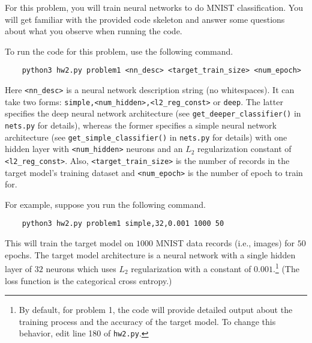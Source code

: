 For this problem, you will train neural networks to do MNIST classification. You will get familiar with the provided code skeleton and answer some questions about what you observe when running the code. 

To run the code for this problem, use the following command.
%
\begin{Verbatim}
	python3 hw2.py problem1 <nn_desc> <target_train_size> <num_epoch>
\end{Verbatim}
%

Here \texttt{<nn\_desc>} is a neural network description string (no whitespaces). It can take two forms: \texttt{simple,<num\_hidden>,<l2\_reg\_const>} or \texttt{deep}. The latter specifies the deep neural network architecture (see \texttt{get\_deeper\_classifier()} in \texttt{nets.py} for details), whereas the former specifies a simple neural network architecture (see \texttt{get\_simple\_classifier()} in \texttt{nets.py} for details) with one hidden layer with \texttt{<num\_hidden>} neurons and an $L_2$ regularization constant of \texttt{<l2\_reg\_const>}. Also, \texttt{<target\_train\_size>} is the number of records in the target model's training dataset and \texttt{<num\_epoch>} is the number of epoch to train for.


For example, suppose you run the following command.
%
\begin{Verbatim}
	python3 hw2.py problem1 simple,32,0.001 1000 50
\end{Verbatim}
This will train the target model on $1000$ MNIST data records (i.e., images) for $50$ epochs. The target model architecture is a neural network with a single hidden layer of $32$ neurons which uses $L_2$ regularization with a constant of $0.001$.\footnote{By default, for problem 1, the code will provide detailed output about the training process and the accuracy of the target model. To change this behavior, edit line 180 of \texttt{hw2.py}.} (The loss function is the categorical cross entropy.)



